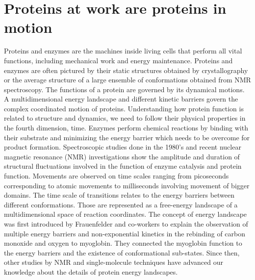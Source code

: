 \section{Proteins at work are proteins in motion}
Proteins and enzymes are the machines inside living cells that perform all vital functions, including mechanical work and energy maintenance.
Proteins and enzymes are often pictured by their static structures obtained by crystallography or the average structure of a large ensemble of conformations obtained from NMR spectroscopy.
The functions of a protein are governed by its dynamical motions. A multidimensional energy landscape and different kinetic barriers govern the complex coordinated motion of proteins. Understanding how protein function is related to structure and dynamics, we need to follow their physical properties in the fourth dimension, time. Enzymes perform chemical reactions by binding with their substrate and minimizing the energy barrier which needs to be overcome for product formation.
Spectroscopic studies done in the 1980's and recent nuclear magnetic resonance (NMR) investigations show the amplitude and duration of structural fluctuations involved in the function of enzyme catalysis and protein function.
Movements are observed on time scales ranging from picoseconds corresponding to atomic movements to milliseconds involving movement of bigger domains.\cite{henzler-wildman2007dynamic,frauenfelder1991the}
The time scale of transitions relates to the energy barriers between different conformations. Those are represented as a free-energy landscape of a multidimensional space of reaction coordinates.
The concept of energy landscape was first introduced by Frauenfelder and co-workers\cite{frauenfelder1991the} to explain the observation of multiple energy barriers and non-exponential kinetics in the rebinding of carbon monoxide and oxygen to myoglobin.
They connected the myoglobin function to the energy barriers and the existence of conformational sub-states.
Since then, other studies by NMR and single-molecule techniques have advanced our knowledge about the details of protein energy landscapes.

